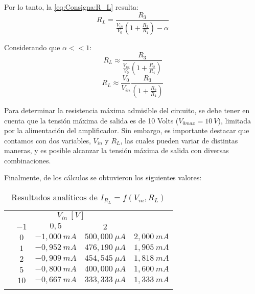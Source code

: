 Por lo tanto, la \autoref{eq:Consigna:R_L} resulta:
\begin{equation}
    \boxed{R_L=\frac{R_3}{\frac{V_{in}}{V_0}\left(1+\frac{R_2}{R_4}\right)-\alpha}}
\end{equation}

Considerando que $\alpha<<1$:
\begin{equation*}
    R_L \approx \frac{R_3}{\frac{V_{in}}{V_0}\left(1+\frac{R_2}{R_4}\right)}
\end{equation*}    
\begin{equation}
    \boxed{R_L \approx \frac{V_0}{V_{in}}\frac{R_3}{\left(1+\frac{R_2}{R_4}\right)}}
\end{equation}

Para determinar la resistencia máxima admisible del circuito, se debe tener en cuenta que la tensión máxima de salida es de 10 Volts ($V_{0max}=10~V$), limitada por la alimentación del amplificador. Sin embargo, es importante destacar que contamos con dos variables, $V_{in}$ y $R_L$, las cuales pueden variar de distintas maneras, y es posible alcanzar la tensión máxima de salida con diversas combinaciones.

Finalmente, de los cálculos se obtuvieron los siguientes valores:
\begin{table}[H]
    \centering
    \begin{tabular}{|c|c|c|c|c|}
        \hhline{-----}
        \multicolumn{2}{|c|}{\multirow{2}{*}{$I_{R_L}$}} & \multicolumn{3}{c|}{$V_{in}~[V]$}\\
        \hhline{~~---}
        \multicolumn{2}{|c|}{} & $-1$ & $0,5$ & $2$ \\
        \hhline{-----}
        \multirow{5}{*}{$R_L~[k\Omega]$} & $0$ & $-1,000~mA$ & $500,000~\mu A$ & $2,000~mA$ \\
        \hhline{~----}
         & $1$ & $-0,952~mA$ & $476,190~\mu A$ & $1,905~mA$ \\
        \hhline{~----}
         & $2$ & $-0,909~mA$ & $454,545~\mu A$ & $1,818~mA$ \\
        \hhline{~----}
         & $5$ & $-0,800~mA$ & $400,000~\mu A$ & $1,600~mA$ \\
        \hhline{~----}
         & $10$ & $-0,667~mA$ & $333,333~\mu A$ & $1,333~mA$ \\
        \hhline{-----}
    \end{tabular}
    \caption{Resultados analíticos de $I_{R_L}=f(V_{in}, R_L)$}
    \label{tab:ResultadosCalculo}
\end{table}

